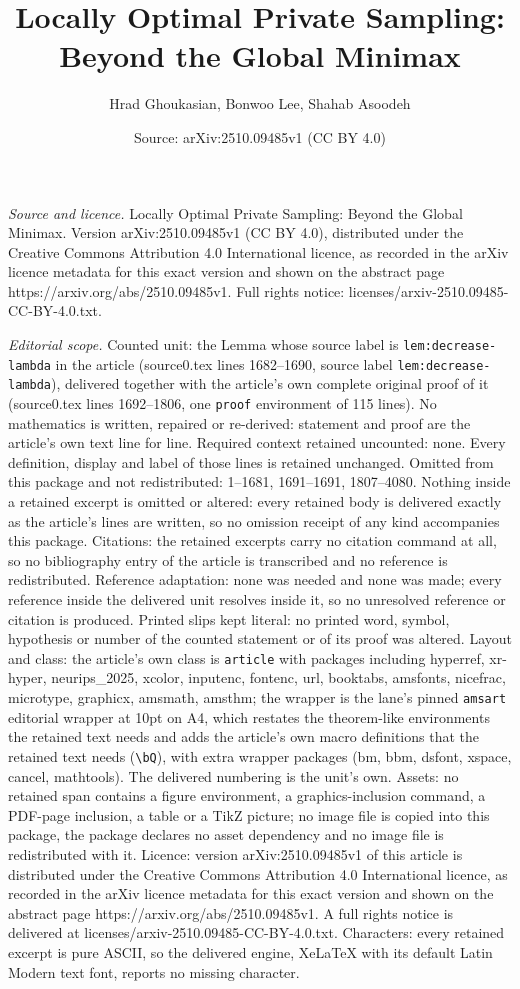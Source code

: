 \documentclass[10pt,a4paper]{amsart}
\title[Locally Optimal Private Sampling: Beyond the Global Minimax]{Locally Optimal Private Sampling: Beyond the Global Minimax}
\author{Hrad Ghoukasian, Bonwoo Lee, Shahab Asoodeh}
\date{Source: arXiv:2510.09485v1 (CC BY 4.0)}
\begin{document}
\maketitle

\noindent\emph{Source and licence.} Locally Optimal Private Sampling: Beyond the Global Minimax. Version arXiv:2510.09485v1 (CC BY 4.0), distributed under the Creative Commons Attribution 4.0 International licence, as recorded in the arXiv licence metadata for this exact version and shown on the abstract page https://arxiv.org/abs/2510.09485v1. Full rights notice: licenses/arxiv-2510.09485-CC-BY-4.0.txt.\par\smallskip

\noindent\textit{Editorial scope.} Counted unit: the Lemma whose source label is \texttt{lem:decrease-lambda} in the article (source0.tex lines 1682--1690, source label \texttt{lem:decrease-lambda}), delivered together with the article's own complete original proof of it (source0.tex lines 1692--1806, one \texttt{proof} environment of 115 lines). No mathematics is written, repaired or re-derived: statement and proof are the article's own text line for line. Required context retained uncounted: none. Every definition, display and label of those lines is retained unchanged. Omitted from this package and not redistributed: 1--1681, 1691--1691, 1807--4080. Nothing inside a retained excerpt is omitted or altered: every retained body is delivered exactly as the article's lines are written, so no omission receipt of any kind accompanies this package. Citations: the retained excerpts carry no citation command at all, so no bibliography entry of the article is transcribed and no reference is redistributed. Reference adaptation: none was needed and none was made; every reference inside the delivered unit resolves inside it, so no unresolved reference or citation is produced. Printed slips kept literal: no printed word, symbol, hypothesis or number of the counted statement or of its proof was altered. Layout and class: the article's own class is \texttt{article} with packages including hyperref, xr-hyper, neurips\_2025, xcolor, inputenc, fontenc, url, booktabs, amsfonts, nicefrac, microtype, graphicx, amsmath, amsthm; the wrapper is the lane's pinned \texttt{amsart} editorial wrapper at 10pt on A4, which restates the theorem-like environments the retained text needs and adds the article's own macro definitions that the retained text needs (\texttt{\textbackslash bQ}), with extra wrapper packages (bm, bbm, dsfont, xspace, cancel, mathtools). The delivered numbering is the unit's own. Assets: no retained span contains a figure environment, a graphics-inclusion command, a PDF-page inclusion, a table or a TikZ picture; no image file is copied into this package, the package declares no asset dependency and no image file is redistributed with it. Licence: version arXiv:2510.09485v1 of this article is distributed under the Creative Commons Attribution 4.0 International licence, as recorded in the arXiv licence metadata for this exact version and shown on the abstract page https://arxiv.org/abs/2510.09485v1. A full rights notice is delivered at licenses/arxiv-2510.09485-CC-BY-4.0.txt. Characters: every retained excerpt is pure ASCII, so the delivered engine, XeLaTeX with its default Latin Modern text font, reports no missing character.
\end{document}
